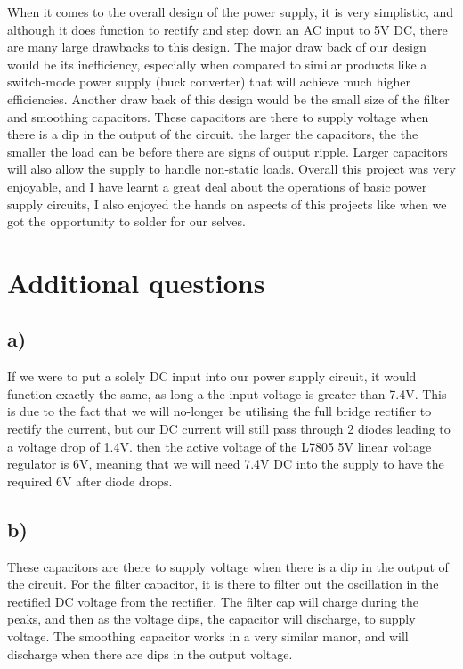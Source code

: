 \documentclass[a4paper,11pt]{article}
\begin{document}
When it comes to the overall design of the power supply, it is very simplistic, and although it does function to rectify and step down an AC input to 5V DC, there are many large drawbacks to this design. The major draw back of our design would be its inefficiency, especially when compared to similar products like a switch-mode power supply (buck converter) that will achieve much higher efficiencies. Another draw back of this design would be the small size of the filter and smoothing capacitors. These capacitors are there to supply voltage when there is a dip in the output of the circuit. the larger the capacitors, the the smaller the load can be before there are signs of output ripple. Larger capacitors will also allow the supply to handle non-static loads.
Overall this project was very enjoyable, and I have learnt a great deal about the operations of basic power supply circuits, I also enjoyed the hands on aspects of this projects like when we got the opportunity to solder for our selves. 

\section{Additional questions}
\subsection*{a)}
If we were to put a solely DC input into our power supply circuit, it would function exactly the same, as long a the input voltage is greater than 7.4V. This is due to the fact that we will no-longer be utilising the full bridge rectifier to rectify the current, but our DC current will still pass through 2 diodes leading to a voltage drop of 1.4V. then the active voltage of the L7805 5V linear voltage regulator is 6V, meaning that we will need 7.4V DC into the supply to have the required 6V after diode drops.

\subsection*{b)}
These capacitors are there to supply voltage when there is a dip in the output of the circuit. For the filter capacitor, it is there to filter out the oscillation  in the rectified DC voltage from the rectifier. The filter cap will charge during the peaks, and then as the voltage dips, the capacitor will discharge, to supply voltage. The smoothing capacitor works in a very similar manor, and will discharge when there are dips in the output voltage.
\end{document}
